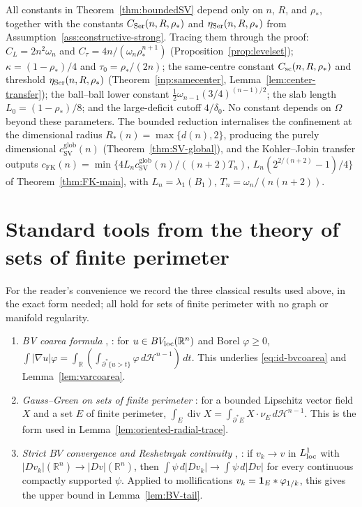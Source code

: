\documentclass[11pt]{amsart}
\theoremstyle{definition}
\newcommand{\R}{\mathbb R}
\newcommand{\Om}{\Omega}
\newcommand{\rstar}{\rho_*}
\newcommand{\Hn}{\mathcal H^{n-1}}
\begin{document}
\noindent
All constants in Theorem~\ref{thm:boundedSV} depend only on \(n\), \(R\), and
\(\rstar\), together with the constants \(C_{\rm Ser}(n,R,\rstar)\) and
\(\eta_{\rm Ser}(n,R,\rstar)\) from Assumption~\ref{ass:constructive-strong}.
Tracing them through the proof: \(C_L=2n^2\omega_n\) and
\(C_\tau=4n/(\omega_n\rstar^{n+1})\) (Proposition~\ref{prop:levelset});
\(\kappa=(1-\rstar)/4\) and \(\tau_0=\rstar/(2n)\); the same-centre constant
\(C_{\rm sc}(n,R,\rstar)\) and threshold \(\eta_{\rm Ser}(n,R,\rstar)\)
(Theorem~\ref{inp:samecenter}, Lemma~\ref{lem:center-transfer}); the ball--ball
lower constant \(\tfrac12\omega_{n-1}(3/4)^{(n-1)/2}\); the slab length
\(L_0=(1-\rstar)/8\); and the large-deficit cutoff \(4/\delta_0\).  No constant
depends on \(\Om\) beyond these parameters.  The bounded reduction internalises
the confinement at the dimensional radius \(R_*(n)=\max\{d(n),2\}\), producing
the purely dimensional \(c_{\mathrm{SV}}^{\mathrm{glob}}(n)\)
(Theorem~\ref{thm:SV-global}), and the Kohler--Jobin transfer outputs
\(c_{\mathrm{FK}}(n)=\min\{4L_n c_{\mathrm{SV}}^{\mathrm{glob}}(n)/((n+2)T_n),\,
L_n(2^{2/(n+2)}-1)/4\}\) of Theorem~\ref{thm:FK-main}, with
\(L_n=\lambda_1(B_1)\), \(T_n=\omega_n/(n(n+2))\).

\appendix

\section{Standard tools from the theory of sets of finite perimeter}
\label{app:bv}

For the reader's convenience we record the three classical results used above,
in the exact form needed; all hold for sets of finite perimeter with no graph
or manifold regularity.

\begin{enumerate}[leftmargin=2em]
\item \emph{BV coarea formula} \cite[Thm.~13.1]{Maggi2012},
\cite[Thm.~3.40]{AFP2000}: for \(u\in BV_{\rm loc}(\R^n)\) and Borel
\(\varphi\ge0\),
\(\int|\nabla u|\varphi=\int_{\R}(\int_{\partial^*\{u>t\}}\varphi\,d\Hn)\,dt\).
This underlies \eqref{eq:id-bvcoarea} and Lemma~\ref{lem:varcoarea}.
\item \emph{Gauss--Green on sets of finite perimeter}
\cite[Ch.~17]{Maggi2012}: for a bounded Lipschitz vector field \(X\) and a set
\(E\) of finite perimeter,
\(\int_E\operatorname{div}X=\int_{\partial^*E}X\cdot\nu_E\,d\Hn\).  This is the
form used in Lemma~\ref{lem:oriented-radial-trace}.
\item \emph{Strict \(BV\) convergence and Reshetnyak continuity}
\cite[Thm.~2.39]{AFP2000}, \cite[Ch.~20]{Maggi2012}: if
\(v_k\to v\) in \(L^1_{\rm loc}\) with \(|Dv_k|(\R^n)\to|Dv|(\R^n)\), then
\(\int\psi\,d|Dv_k|\to\int\psi\,d|Dv|\) for every continuous compactly
supported \(\psi\).  Applied to mollifications \(v_k={\bf1}_E*\varphi_{1/k}\),
this gives the upper bound in Lemma~\ref{lem:BV-tail}.
\end{enumerate}
\end{document}
